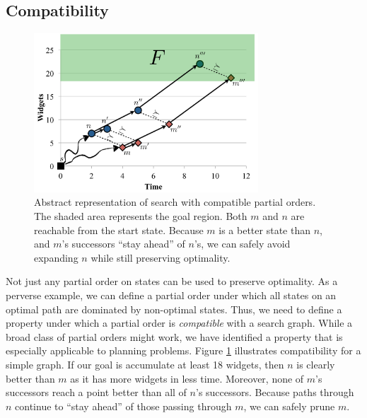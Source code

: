 \documentclass[letterpaper]{article}
\theoremstyle{plain} \newtheorem{theorem}{Theorem} \newtheorem{proposition}{Proposition} \newtheorem{lemma}{Lemma}
\theoremstyle{definition} \newtheorem{definition}{Definition} \newtheorem{conjecture}{Conjecture} \newtheorem*{example}{Example}
\theoremstyle{remark} \newtheorem*{remark}{Remark} \newtheorem*{note}{Note} \newtheorem{case}{Case}
\begin{document}
\subsection{Compatibility}
\begin{figure}
	\begin{center}
	\includegraphics[width=3.3in]{compatibility-2.pdf}
\end{center}
  \caption{Abstract representation of search with compatible partial
  orders. The shaded area represents the goal region. Both $m$ and $n$ are reachable from the start state.
  Because $m$ is a better state than $n$, and $m$'s successors
  ``stay ahead'' of $n$'s, we can safely avoid expanding $n$ while
  still preserving optimality.}
  \label{fig:compatibility}
\end{figure}

Not just any partial order on states can be used to preserve optimality. As a perverse
example, we can define a partial order under which all states
on an optimal path
are dominated by non-optimal states. Thus, we need to define a property
under which a partial order is \textit{compatible} with a search graph. 
While a broad class of partial orders might work, we have identified
a property that is especially applicable to planning problems.
Figure \ref{fig:compatibility} illustrates 
compatibility for a simple graph. If our goal is accumulate at
least 18 widgets, then $n$ is clearly better than $m$ as
it has more widgets in less time. Moreover, none
of $m$'s successors reach a point better than all of $n$'s 
successors. Because paths through $n$ continue to
``stay ahead'' of those passing through $m$, we
can safely prune $m$.
\end{document}

